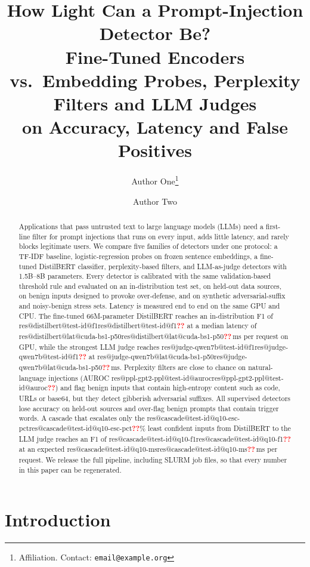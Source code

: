\documentclass[11pt]{article}
\title{How Light Can a Prompt-Injection Detector Be?\\[0.3em]
\large Fine-Tuned Encoders vs.\ Embedding Probes, Perplexity Filters and LLM Judges\\
on Accuracy, Latency and False Positives}
\author{Author One\thanks{Affiliation. Contact: \texttt{email@example.org}} \and Author Two}
\date{}
\makeatletter
\newif\ifdraft
\newcommand{\claim}[1]{\ifdraft{\color{blue!65!black}#1}\else#1\fi}
\newcommand{\res}[3]{\ifcsname res@#1@#2@#3\endcsname\csname res@#1@#2@#3\endcsname\else\textbf{\textcolor{red}{??}}\fi}
\makeatother
\begin{document}
\maketitle

\begin{abstract}
Applications that pass untrusted text to large language models (LLMs) need a
first-line filter for prompt injections that runs on every input, adds little latency,
and rarely blocks legitimate users. We compare five families of detectors under one
protocol: a TF-IDF baseline, logistic-regression probes on frozen sentence embeddings,
a fine-tuned DistilBERT classifier, perplexity-based filters, and LLM-as-judge detectors
with 1.5B--8B parameters. Every detector is calibrated with the same validation-based
threshold rule and evaluated on an in-distribution test set, on held-out data sources,
on benign inputs designed to provoke over-defense, and on synthetic adversarial-suffix
and noisy-benign stress sets. Latency is measured end to end on the same GPU and CPU.
\claim{The fine-tuned 66M-parameter DistilBERT reaches an in-distribution F1 of
\res{distilbert}{test-id}{f1} at a median latency of
\res{distilbert}{lat}{cuda-bs1-p50}\,ms per request on GPU, while the strongest LLM judge
reaches \res{judge-qwen7b}{test-id}{f1} at \res{judge-qwen7b}{lat}{cuda-bs1-p50}\,ms.
Perplexity filters are close to chance on natural-language injections
(AUROC \res{ppl-gpt2-ppl}{test-id}{auroc}) and flag benign inputs that contain
high-entropy content such as code, URLs or base64, but they detect gibberish adversarial
suffixes.}
\claim{All supervised detectors lose accuracy on held-out sources and over-flag benign
prompts that contain trigger words.} A cascade that escalates only the
\res{cascade}{test-id}{q10-esc-pct}\% least confident inputs from DistilBERT to the
LLM judge reaches an F1 of \res{cascade}{test-id}{q10-f1} at an expected
\res{cascade}{test-id}{q10-ms}\,ms per request. We release the full pipeline,
including SLURM job files, so that every number in this paper can be regenerated.
\end{abstract}

\section{Introduction}
\label{sec:intro}
\end{document}

